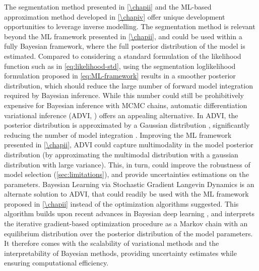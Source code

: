 The segmentation method presented in \cref{\chapii} and the ML-based approximation method developed in \cref{\chapiv} offer unique development opportunities to leverage inverse modelling.
%
The segmentation method is relevant beyond the ML framework presented in \cref{\chapii}, and could be used within a fully Bayesian framework, where the full posterior distribution of the model is estimated. Compared to considering a standard formulation of the likelihood function such as in \cref{eq:likelihood-std}, using the segmentation loglikelihood formulation proposed in \cref{eq:ML-framework} results in a smoother posterior distribution, which should reduce the large number of forward model integration required by Bayesian inference.
% 
While this number could still be prohibitively expensive for Bayesian inference with MCMC chains, automatic differentiation variational inference (ADVI, \cite{Morningstar2020,Gosh2021}) offers an appealing alternative. In ADVI, the posterior distribution is approximated by a Gaussian distribution \citep{Morningstar2020}, significantly reducing the number of model integration \citep{Morningstar2020}. Improving the ML framework presented in \cref{\chapii}, ADVI could capture multimodality in the model posterior distribution (by approximating the multimodal distribution with a gaussian distribution with large variance). This, in turn, could improve the robustness of model selection (\cref{sec:limitations}), and provide uncertainties estimations on the parameters.
% 
Bayesian Learning via Stochastic Gradient Langevin Dynamics \citep{Welling2011BayesianLV} is an alternate solution to ADVI, that could readily be used with the ML framework proposed in \cref{\chapii} instead of the optimization algorithms suggested. This algorithm builds upon recent advances in Bayesian deep learning \citep{Wilson2020}, and interprets the iterative gradient-based optimization procedure as a Markov chain with an equilibrium distribution over the posterior distribution of the model parameters. It therefore comes with the scalability of variational methods and the interpretability of Bayesian methods, providing uncertainty estimates while ensuring computational efficiency.


